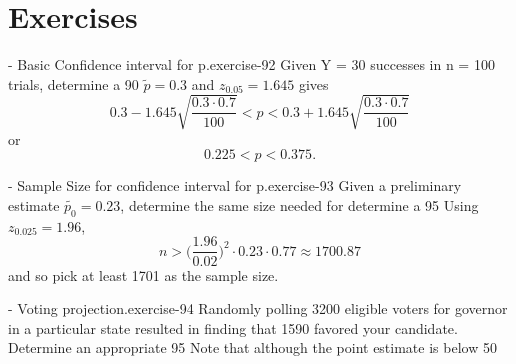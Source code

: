 \documentclass[10pt,]{book}
\numberwithin{equation}{section}
\newcommand{\lt}{<}
\newcommand{\gt}{>}
\begin{document}
\section[{Exercises}]{Exercises}\label{section-71}
\hypertarget{p-1349}{}%
\begin{inlineexercise}{- Basic Confidence interval for p.}{exercise-92}%
\hypertarget{p-1350}{}%
Given Y = 30 successes in n = 100 trials, determine a 90%
\hypertarget{p-1351}{}%
\(\tilde{p} = 0.3\) and \(z_{0.05} = 1.645\) gives%
\begin{equation*}
0.3 - 1.645 \sqrt{\frac{0.3 \cdot 0.7}{100}} \lt p \lt 0.3 + 1.645 \sqrt{\frac{0.3 \cdot 0.7}{100}}
\end{equation*}
or%
\begin{equation*}
0.225 \lt p \lt 0.375.
\end{equation*}
%
%
\end{inlineexercise}
 \begin{inlineexercise}{- Sample Size for confidence interval for p.}{exercise-93}%
\hypertarget{p-1352}{}%
Given a preliminary estimate \(\tilde{p_0} = 0.23\), determine the same size needed for determine a 95%
\hypertarget{p-1353}{}%
Using \(z_{0.025} = 1.96\),%
\begin{equation*}
n \gt \big ( \frac{1.96}{0.02} \big )^2 \cdot 0.23 \cdot 0.77 \approx 1700.87
\end{equation*}
and so pick at least 1701 as the sample size.%
%
\end{inlineexercise}
 \begin{inlineexercise}{- Voting projection.}{exercise-94}%
\hypertarget{p-1354}{}%
Randomly polling 3200 eligible voters for governor in a particular state resulted in finding that 1590 favored your candidate. Determine an appropriate 95%
\hypertarget{p-1355}{}%
Note that although the point estimate is below 50%
%
\end{inlineexercise}
\end{document}

